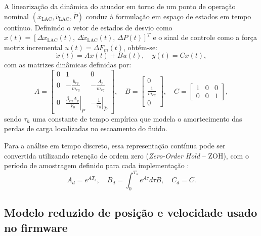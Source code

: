 A linearização da dinâmica do atuador em torno de um ponto de operação nominal $(\bar{x}_{\mathrm{LAC}}, \bar{v}_{\mathrm{LAC}}, \bar{P})$ conduz à formulação em espaço de estados em tempo contínuo. Definindo o vetor de estados de desvio como $x(t) = [\Delta x_{\mathrm{LAC}}(t),\, \Delta \dot{x}_{\mathrm{LAC}}(t),\, \Delta P(t)]^T$ e o sinal de controle como a força motriz incremental $u(t) = \Delta F_m(t)$, obtém-se:
\begin{equation}
    \dot{x}(t) = A x(t) + B u(t), \quad y(t) = C x(t),
    \label{eq:estados_continuo_lac}
\end{equation}
com as matrizes dinâmicas definidas por:
\begin{equation}
    A = \begin{bmatrix}
        0 & 1 & 0 \\
        0 & -\frac{b_{eq}}{m_{eq}} & -\frac{A_p}{m_{eq}} \\
        0 & \left.\frac{\beta_{\mathrm{eff}} A_p}{V_0}\right|_{\bar{P}} & -\left.\frac{1}{\tau_h}\right|_{\bar{P}}
    \end{bmatrix}, \quad
    B = \begin{bmatrix}
        0 \\
        \frac{1}{m_{eq}} \\
        0
    \end{bmatrix}, \quad
    C = \begin{bmatrix}
        1 & 0 & 0 \\
        0 & 0 & 1
    \end{bmatrix},
    \label{eq:matrizes_continuas_lac}
\end{equation}
sendo $\tau_h$ uma constante de tempo empírica que modela o amortecimento das perdas de carga localizadas no escoamento do fluido.

Para a análise em tempo discreto, essa representação contínua pode ser convertida utilizando retenção de ordem zero (\textit{Zero-Order Hold} -- ZOH), com o período de amostragem definido para cada implementação \cite{FranklinPowellWorkman1998, BrunoAAngelico2018}:
\begin{equation}
    A_d = e^{A T_s}, \quad B_d = \int_0^{T_s} e^{A \tau} d\tau B, \quad C_d = C.
    \label{eq:discretizacao_zoh}
\end{equation}

\subsection{Modelo reduzido de posição e velocidade usado no firmware}
\label{sec:modelo-reduzido-lac-firmware}

